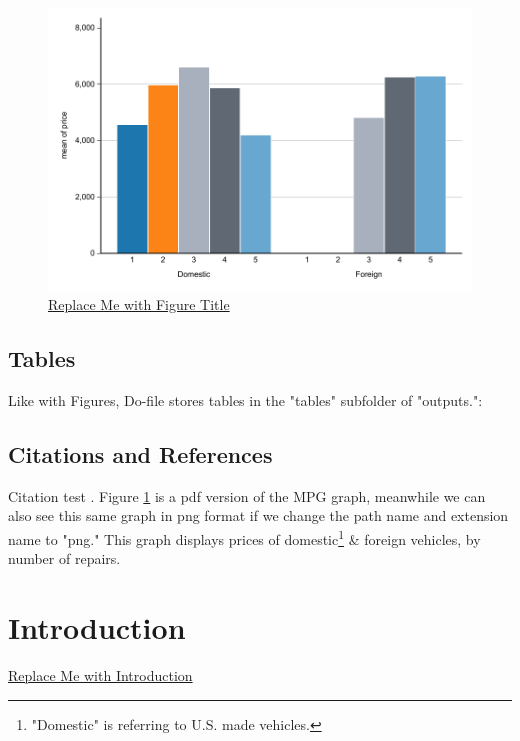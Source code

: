 \documentclass[12pt]{article}
\begin{document}
\begin{figure}[ht]
	\centering
	\caption{\underline{Replace Me with Figure Title}}
	\label{fig:Replace_Me_with_Ref_Label}
	\includegraphics[width=1\textwidth]
		{outputs/figures/pdf/figure_replace_me.pdf}
\end{figure}

\subsection{Tables}

Like with Figures, 
Do-file stores tables in the "tables" subfolder of "outputs.": 



\subsection{Citations and References}

Citation test \parencite{storer2023sweet}. 
Figure \ref{fig:Replace_Me_with_Ref_Label} is a pdf version of 
the MPG graph, meanwhile we can also see this same graph in png format 
if we change the path name and extension name to "png." 
This graph displays prices of 
domestic\footnote
{
	"Domestic" is referring to U.S. made vehicles.\label{fnote:domestic}
} 
\& foreign vehicles, by number of repairs.

\section{Introduction}

\underline{Replace Me with Introduction}


\printbibliography%
\end{document}
